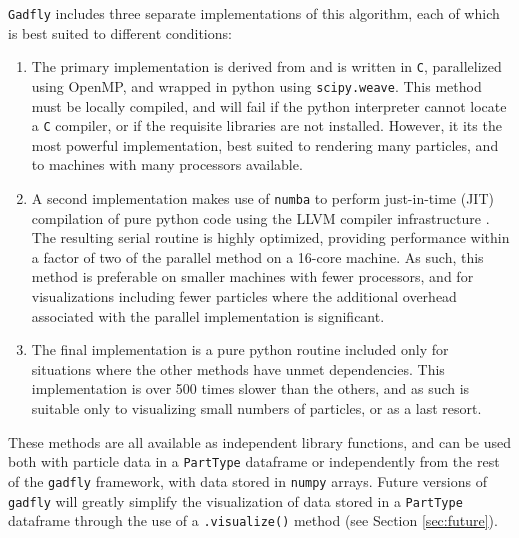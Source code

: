 \documentclass{emulateapj}
\newcommand{\code}[1]{\texttt{#1}}
\begin{document}
\code{Gadfly} includes three separate implementations of this algorithm, each of which is best suited to different conditions:
\begin{enumerate}
\item The primary implementation is derived from \citet{NavratilJohnsonBromm2007} and is written in \code{C}, parallelized using OpenMP, and wrapped in python using \code{scipy.weave}.  This method must be locally compiled, and will fail if the python interpreter cannot locate a \code{C} compiler, or if the requisite libraries are not installed.  However, it its the most powerful implementation, best suited to rendering many particles, and to machines with many processors available.
\item A second implementation makes use of \code{numba} \citep{LamPitrouSeibert2015} to perform just-in-time (JIT) compilation of pure python code using the LLVM compiler infrastructure \citep{LattnerAdve2004}.  The resulting serial routine is highly optimized, providing performance within a factor of two of the parallel method on a 16-core machine.  As such, this method is preferable on smaller machines with fewer processors, and for visualizations including fewer particles where the additional overhead associated with the parallel implementation is significant.
\item The final implementation is a pure python routine included only for situations where the other methods have unmet dependencies. This implementation is over 500 times slower than the others, and as such is suitable only to visualizing small numbers of particles, or as a last resort.
\end{enumerate}

These methods are all available as independent library functions, and can be used both with particle data in a \code{PartType} dataframe or independently from the rest of the \code{gadfly} framework, with data stored in \code{numpy} arrays.  
Future versions of \code{gadfly} will greatly simplify the visualization of data stored in a \code{PartType} dataframe through the use of a \code{.visualize()} method (see Section \ref{sec:future}).
\end{document}

